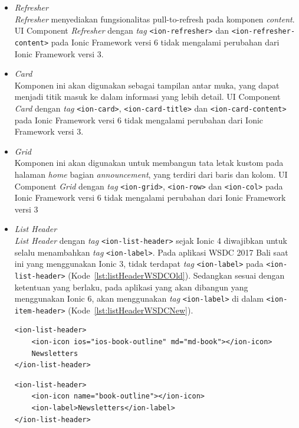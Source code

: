 \begin{enumerate}
\begin{enumerate}
\begin{itemize}
			\item \textit{Refresher} \\
		\textit{Refresher} menyediakan fungsionalitas  pull-to-refresh pada komponen \textit{content}. UI Component \textit{Refresher} dengan \textit{tag} \texttt{<ion-refresher>} dan \texttt{<ion-refresher-content>} pada Ionic Framework versi 6 tidak mengalami perubahan dari Ionic Framework versi 3.	
		
			\item \textit{Card} \\
			Komponen ini akan digunakan sebagai tampilan antar muka, yang dapat menjadi titik masuk ke dalam informasi yang lebih detail. UI Component \textit{Card} dengan \textit{tag} \texttt{<ion-card>}, \texttt{<ion-card-title>} dan \texttt{<ion-card-content>} pada Ionic Framework versi 6 tidak mengalami perubahan dari Ionic Framework versi 3.
			
			\item \textit{Grid} \\
			Komponen ini akan digunakan untuk membangun tata letak kustom pada halaman \textit{home} bagian \textit{announcement}, yang terdiri dari baris dan kolom. UI Component \textit{Grid} dengan \textit{tag} \texttt{<ion-grid>}, \texttt{<ion-row>} dan \texttt{<ion-col>} pada Ionic Framework versi 6 tidak mengalami perubahan dari Ionic Framework versi 3
			
			\item \textit{List Header} \\
			\textit{List Header} dengan \textit{tag} \texttt{<ion-list-header>} sejak Ionic 4 diwajibkan untuk selalu menambahkan \textit{tag} \texttt{<ion-label>}. Pada aplikasi WSDC 2017 Bali saat ini yang menggunakan Ionic 3, tidak terdapat \textit{tag} \texttt{<ion-label>} pada \texttt{<ion-list-header>} (Kode~\ref{lst:listHeaderWSDCOld}). Sedangkan sesuai dengan ketentuan yang berlaku, pada aplikasi yang akan dibangun yang menggunakan Ionic 6, akan menggunakan \textit{tag} \texttt{<ion-label>} di dalam \texttt{<ion-item-header>} (Kode~\ref{lst:listHeaderWSDCNew}).
			
\begin{lstlisting}[label={lst:listHeaderWSDCOld}, caption=\textit{Tag} <ion-list-header> dengan Ionic 3 di Aplikasi WSDC 2017 Bali Saat Ini]
<ion-list-header>
	<ion-icon ios="ios-book-outline" md="md-book"></ion-icon>
    Newsletters
</ion-list-header>
\end{lstlisting}

\begin{lstlisting}[label={lst:listHeaderWSDCNew}, caption=\textit{Tag} <ion-list-header> dengan Ionic 6 di Aplikasi WSDC 2017 Bali yang Akan dibuat]
<ion-list-header>
	<ion-icon name="book-outline"></ion-icon>
    <ion-label>Newsletters</ion-label>
</ion-list-header>
\end{lstlisting}
			

\end{itemize}
\end{enumerate}
\end{enumerate}
